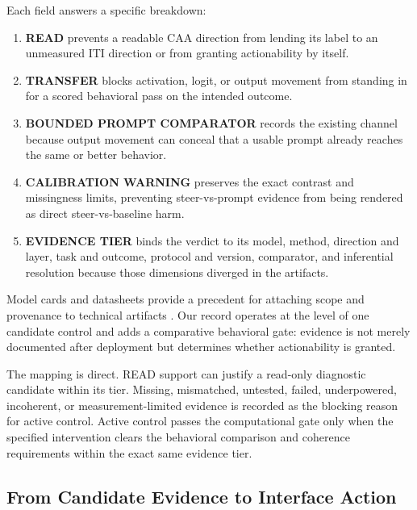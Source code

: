 \documentclass[sigconf]{acmart}
\begin{document}
Each field answers a specific breakdown:
\begin{enumerate}
  \item \textbf{READ} prevents a readable CAA direction from lending its label to an unmeasured ITI direction or from granting actionability by itself.
  \item \textbf{TRANSFER} blocks activation, logit, or output movement from standing in for a scored behavioral pass on the intended outcome.
  \item \textbf{BOUNDED PROMPT COMPARATOR} records the existing channel because output movement can conceal that a usable prompt already reaches the same or better behavior.
  \item \textbf{CALIBRATION WARNING} preserves the exact contrast and missingness limits, preventing steer-vs-prompt evidence from being rendered as direct steer-vs-baseline harm.
  \item \textbf{EVIDENCE TIER} binds the verdict to its model, method, direction and layer, task and outcome, protocol and version, comparator, and inferential resolution because those dimensions diverged in the artifacts.
\end{enumerate}

Model cards and datasheets provide a precedent for attaching scope and provenance to technical artifacts \cite{mitchell2019modelcards,gebru2021datasheets}. Our record operates at the level of one candidate control and adds a comparative behavioral gate: evidence is not merely documented after deployment but determines whether actionability is granted.

The mapping is direct. READ support can justify a read-only diagnostic candidate within its tier. Missing, mismatched, untested, failed, underpowered, incoherent, or measurement-limited evidence is recorded as the blocking reason for active control. Active control passes the computational gate only when the specified intervention clears the behavioral comparison and coherence requirements within the exact same evidence tier.

\subsection{From Candidate Evidence to Interface Action}
\end{document}

